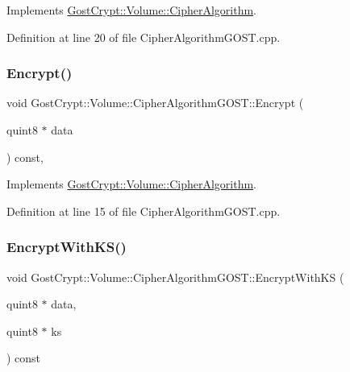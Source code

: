 Implements \hyperlink{class_gost_crypt_1_1_volume_1_1_cipher_algorithm_aa08e6b739411e759a0489668e818e08b}{Gost\+Crypt\+::\+Volume\+::\+Cipher\+Algorithm}.



Definition at line 20 of file Cipher\+Algorithm\+G\+O\+S\+T.\+cpp.

\mbox{\label{class_gost_crypt_1_1_volume_1_1_cipher_algorithm_g_o_s_t_a9fc68f435da2c76dc944aa6bb36bddc5}} 
\subsubsection{\texorpdfstring{Encrypt()}{Encrypt()}}
{\footnotesize\ttfamily void Gost\+Crypt\+::\+Volume\+::\+Cipher\+Algorithm\+G\+O\+S\+T\+::\+Encrypt (\begin{DoxyParamCaption}\item[{quint8 $\ast$}]{data }\end{DoxyParamCaption}) const\hspace{0.3cm}{\ttfamily [protected]}, {\ttfamily [virtual]}}



Implements \hyperlink{class_gost_crypt_1_1_volume_1_1_cipher_algorithm_a4e8eda4efa7393fa17be1f5dae6cc0e2}{Gost\+Crypt\+::\+Volume\+::\+Cipher\+Algorithm}.



Definition at line 15 of file Cipher\+Algorithm\+G\+O\+S\+T.\+cpp.

\mbox{\label{class_gost_crypt_1_1_volume_1_1_cipher_algorithm_g_o_s_t_a6cc2c22a2d097e24468a3004381df911}} 
\subsubsection{\texorpdfstring{Encrypt\+With\+K\+S()}{EncryptWithKS()}}
{\footnotesize\ttfamily void Gost\+Crypt\+::\+Volume\+::\+Cipher\+Algorithm\+G\+O\+S\+T\+::\+Encrypt\+With\+KS (\begin{DoxyParamCaption}\item[{quint8 $\ast$}]{data,  }\item[{quint8 $\ast$}]{ks }\end{DoxyParamCaption}) const\hspace{0.3cm}{\ttfamily [virtual]}}



